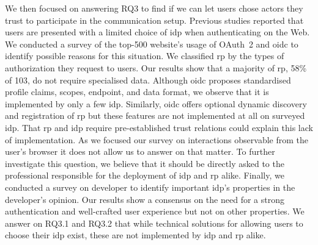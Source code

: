{\begin{minipage}{\overflowingheadlen}
\begin{mdframed}[style=C1Frame,frametitle={\ref{sec:c1Summary}~Summary}]
We then focused on answering RQ3 to find if we can let users chose actors they trust to participate in the communication setup.
Previous studies reported that users are presented with a limited choice of \gls{idp} when authenticating on the Web.
We conducted a survey of the top-500 website's usage of OAuth~2 and \gls{oidc} to identify possible reasons for this situation.
We classified \gls{rp} by the types of authorization they request to users.
Our results show that a majority of \gls{rp}, 58\% of 103, do not require specialised data.
Although \gls{oidc} proposes standardised profile claims, scopes, endpoint, and data format, we observe that it is implemented by only a few \gls{idp}.
Similarly, \gls{oidc} offers optional dynamic discovery and registration of \gls{rp} but these features are not implemented at all on surveyed \gls{idp}.
That \gls{rp} and \gls{idp} require pre-established trust relations could explain this lack of implementation.
As we focused our survey on interactions observable from the user's browser it does not allow us to answer on that matter.
To further investigate this question, we believe that it should be directly asked to the professional responsible for the deployment of \gls{idp} and \gls{rp} alike.
Finally, we conducted a survey on developer to identify important \gls{idp}'s properties in the developer's opinion.
Our results show a consensus on the need for a strong authentication and well-crafted user experience but not on other properties.
We answer on RQ3.1 and RQ3.2 that while technical solutions for allowing users to choose their \gls{idp} exist, these are not implemented by \gls{idp} and \gls{rp} alike.

\end{mdframed}

\end{minipage}
}
\unblockmargin